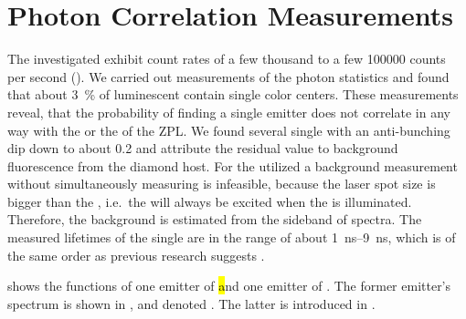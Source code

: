 
	\section{Photon Correlation Measurements} \label{subsec::g2}

		The investigated \sivs exhibit count rates of a few thousand to a few \num{100000} counts per second (\SI{}{\cps}).
		We carried out measurements of the photon statistics and found that about \SI{3}{\percent} of luminescent \nds contain single color centers.
		These measurements reveal, that the probability of finding a single emitter does not correlate in any way with the \cwl or the \lw of the ZPL.
		We found several single \sivs with an anti-bunching dip down to about \num{0.2} and attribute the residual \gtz value to background fluorescence from the diamond host.
		For the utilized \nds a background measurement without simultaneously measuring \siv \pl is infeasible, because the laser spot size is bigger than the \nd, i.e.\ the \siv will always be excited when the \nd is illuminated.
		Therefore, the background is estimated from the sideband of \siv spectra.
		The measured lifetimes of the single \sivs are in the range of about \SIrange{1}{9}{\ns}, which is of the same order as previous research suggests \cite{Sipahigil2014,Sternschulte1994}.

		 shows the \gt functions of one emitter of \hl and one emitter of \vl.
		The former emitter's spectrum is shown in , and denoted \emhtwo. The latter is \embroad introduced in .

